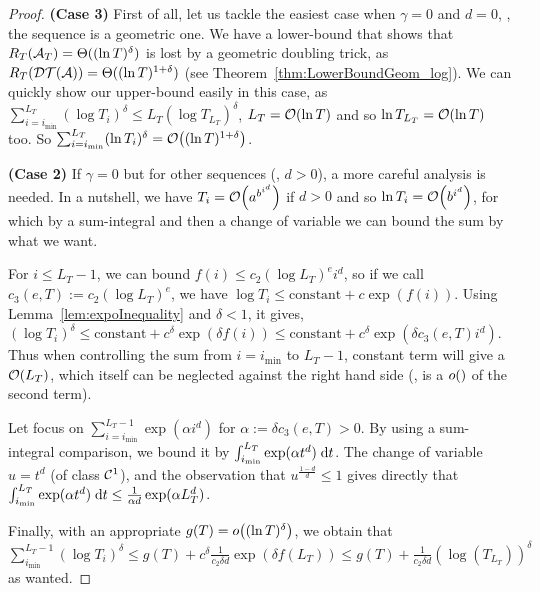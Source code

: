 \documentclass[12pt]{colt2018} %
\begin{document}
\begin{proof}
    \textbf{(Case 3)}
    First of all, let us tackle the easiest case when $\gamma=0$ and $d = 0$, \ie, the sequence is a geometric one.
    We have a lower-bound that shows that $R_T(\mathcal{A}_T) = \Theta((\ln T)^{\delta})$ is lost by a geometric doubling trick, as $R_T(\mathcal{DT}(\mathcal{A})) = \Theta((\ln T)^{1+\delta})$ (see Theorem~\ref{thm:LowerBoundGeom_log}).
    We can quickly show our upper-bound easily in this case,
    as $\sum_{i=i_{\min}}^{L_T} (\log T_i)^{\delta} \leq L_T (\log T_{L_T})^{\delta}$,
    $L_T = \mathop{}\mathopen{}\mathcal{O}\mathopen{}\left(\ln T\right)$ and so $\ln T_{L_T} = \mathop{}\mathopen{}\mathcal{O}\mathopen{}\left(\ln T\right)$ too.
    So $\sum_{i=i_{\min}}^{L_T} (\ln T_i)^{\delta} = \mathop{}\mathopen{}\mathcal{O}\mathopen{}\left((\ln T)^{1+\delta}\right)$.

    \hr{}
    \textbf{(Case 2)}
    If $\gamma=0$ but for other sequences (\ie, $d>0$), a more careful analysis is needed.
    In a nutshell, we have
    $T_i = \mathop{}\mathopen{}\mathcal{O}\mathopen{}\left(a^{b^{i^d}}\right)$ if $d>0$ and so $\ln T_i = \mathop{}\mathopen{}\mathcal{O}\mathopen{}\left(b^{i^d}\right)$,
    for which by a sum-integral and then a change of variable we can bound the sum by what we want.

    For $i \leq L_T - 1$, we can bound $f(i) \leq c_2 (\log L_T)^e i^d$,
    so if we call $c_3(e,T) := c_2 (\log L_T)^e$, we have
    $\log T_i \leq \text{constant} + c \exp(f(i))$.
    Using Lemma~\ref{lem:expoInequality} and $\delta<1$, it gives,
    $(\log T_i)^{\delta} \leq \text{constant} + c^{\delta} \exp(\delta f(i)) \leq \text{constant} + c^{\delta} \exp(\delta c_3(e,T) i^d)$.
    Thus when controlling the sum from $i=i_{\min}$ to $L_T - 1$,
    constant term will give a $\mathop{}\mathopen{}\mathcal{O}\mathopen{}\left(L_T\right)$, which itself can be neglected against the right hand side (\ie, is a $\mathop{}\mathopen{}o\mathopen{}\left(\right)$ of the second term).

    Let focus on $\sum_{i=i_{\min}}^{L_T - 1} \exp(\alpha i^d)$ for $\alpha := \delta c_3(e,T) > 0$.
    By using a sum-integral comparison, we bound it by $\int_{i_{\min}}^{L_T} \exp(\alpha t^d) \;\mathrm{d}t$.
    The change of variable $u = t^d$ (of class $\mathcal{C}^1$), and the observation that $u^{\frac{1-d}{d}} \leq 1$ gives directly that
    $\int_{i_{\min}}^{L_T} \exp(\alpha t^d) \;\mathrm{d}t \leq \frac{1}{\alpha d} \exp(\alpha L_T^d)$.

    Finally, with an appropriate $g(T) = \mathop{}\mathopen{}o\mathopen{}\left((\ln T)^{\delta}\right)$,
    we obtain that
    $\sum_{i_{\min}}^{L_T - 1} (\log T_i)^{\delta} \leq g(T) + c^{\delta} \frac{1}{c_2 \delta d} \exp(\delta f(L_T)) \leq g(T) + \frac{1}{c_2 \delta d} (\log(T_{L_T}))^{\delta}$ as wanted.


\end{proof}
\end{document}
